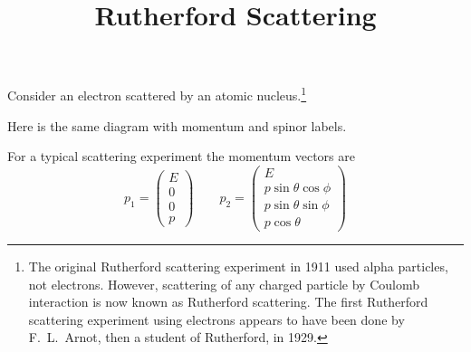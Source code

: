 \documentclass[12pt]{article}
\title{Rutherford Scattering}
\date{}
\begin{document}
\maketitle

\noindent
Consider an electron scattered by an atomic nucleus.\footnote{
The original Rutherford scattering experiment in 1911 used alpha particles, not electrons.
However, scattering of any charged particle by Coulomb interaction
is now known as Rutherford scattering.
The first Rutherford scattering experiment using electrons appears to have
been done by F.~L.~Arnot, then a student of Rutherford, in 1929.}
\begin{center}
\end{center}

\noindent
Here is the same diagram with momentum and spinor labels.
\begin{center}
\end{center}

\noindent
For a typical scattering experiment the momentum vectors are
$$
p_1=\begin{pmatrix}E\\0\\0\\p\end{pmatrix}\qquad
p_2=\begin{pmatrix}
E\\
p\sin\theta\cos\phi\\
p\sin\theta\sin\phi\\
p\cos\theta
\end{pmatrix}
$$
\end{document}
